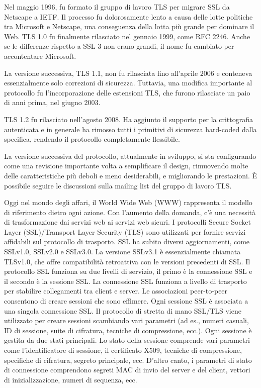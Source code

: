 \documentclass{article}
\theoremstyle{definition}
\begin{document}
Nel maggio 1996, fu formato il gruppo di lavoro TLS per migrare SSL da Netscape a IETF. Il processo fu dolorosamente lento a causa delle lotte politiche tra Microsoft e Netscape, una conseguenza della lotta più grande per dominare il Web. TLS 1.0 fu finalmente rilasciato nel gennaio 1999, come RFC 2246. Anche se le differenze rispetto a SSL 3 non erano grandi, il nome fu cambiato per accontentare Microsoft.

La versione successiva, TLS 1.1, non fu rilasciata fino all'aprile 2006 e conteneva essenzialmente solo correzioni di sicurezza. Tuttavia, una modifica importante al protocollo fu l'incorporazione delle estensioni TLS, che furono rilasciate un paio di anni prima, nel giugno 2003.

TLS 1.2 fu rilasciato nell'agosto 2008. Ha aggiunto il supporto per la crittografia autenticata e in generale ha rimosso tutti i primitivi di sicurezza hard-coded dalla specifica, rendendo il protocollo completamente flessibile.

La versione successiva del protocollo, attualmente in sviluppo, si sta configurando come una revisione importante volta a semplificare il design, rimuovendo molte delle caratteristiche più deboli e meno desiderabili, e migliorando le prestazioni. È possibile seguire le discussioni sulla mailing list del gruppo di lavoro TLS.

Oggi nel mondo degli affari, il World Wide Web (WWW) rappresenta il modello di riferimento dietro ogni azione. Con l'aumento della domanda, c'è una necessità di trasformazione dai servizi web ai servizi web sicuri. I protocolli Secure Socket Layer (SSL)/Transport Layer Security (TLS) sono utilizzati per fornire servizi affidabili sul protocollo di trasporto. SSL ha subito diversi aggiornamenti, come SSLv1.0, SSLv2.0 e SSLv3.0. La versione SSLv3.1 è essenzialmente chiamata TLSv1.0, che offre compatibilità retroattiva con le versioni precedenti di SSL. Il protocollo SSL funziona su due livelli di servizio, il primo è la connessione SSL e il secondo è la sessione SSL. La connessione SSL funziona a livello di trasporto per stabilire collegamenti tra client e server. Le associazioni peer-to-peer consentono di creare sessioni che sono effimere. Ogni sessione SSL è associata a una singola connessione SSL. Il protocollo di stretta di mano SSL/TLS viene utilizzato per creare sessioni scambiando vari parametri (ad es., numeri casuali, ID di sessione, suite di cifratura, tecniche di compressione, ecc.). Ogni sessione è gestita da due stati principali. Lo stato della sessione comprende vari parametri come l'identificatore di sessione, il certificato X509, tecniche di compressione, specifiche di cifratura, segreto principale, ecc. D'altro canto, i parametri di stato di connessione comprendono segreti MAC di invio del server e del client, vettori di inizializzazione, numeri di sequenza, ecc.
\end{document}
